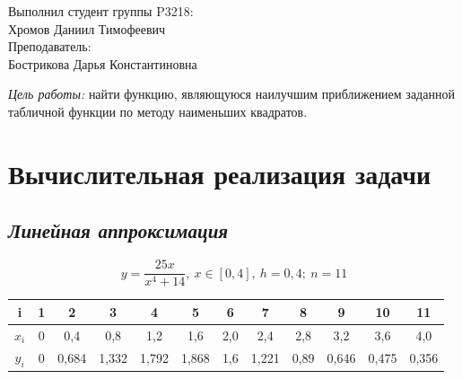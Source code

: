 \documentclass[12pt]{article}
\begin{document}
\pagestyle{fancy}
\thispagestyle{first style}


\vspace{25mm}


\vspace{50mm}

\begin{flushright}
Выполнил студент группы P3218:\\Хромов Даниил Тимофеевич\\
\vspace{5mm}
Преподаватель:\\Бострикова Дарья Константиновна\\
\end{flushright}

\newpage

\pagestyle{empty}
\raggedright

\textit{Цель работы:} найти функцию, являющуюся наилучшим приближением заданной табличной функции по методу наименьших квадратов.\\

\section{Вычислительная реализация задачи}

\subsection*{\textit{Линейная аппроксимация}}
\vspace{5mm}
\[ y = \frac{25x}{x^4 + 14},\ x \in [0,4],\ h = 0,4;\ n = 11 \]
\vspace{5mm}
\centering
\begin{tabular}{ |c|c|c|c|c|c|c|c|c|c|c|c| }
  \hline
  i & 1 & 2 & 3 & 4 & 5 & 6 & 7 & 8 & 9 & 10 & 11\\
  \hline
  $x_i$ & 0 & 0,4 & 0,8 & 1,2 & 1,6 & 2,0 & 2,4 & 2,8 & 3,2 & 3,6 & 4,0 \\
  \hline
  $y_i$ & 0 & 0,684 & 1,332 & 1,792 & 1,868 & 1,6 & 1,221 & 0,89 & 0,646 & 0,475 & 0,356 \\
  \hline
\end{tabular}\\
\raggedright
\end{document}
